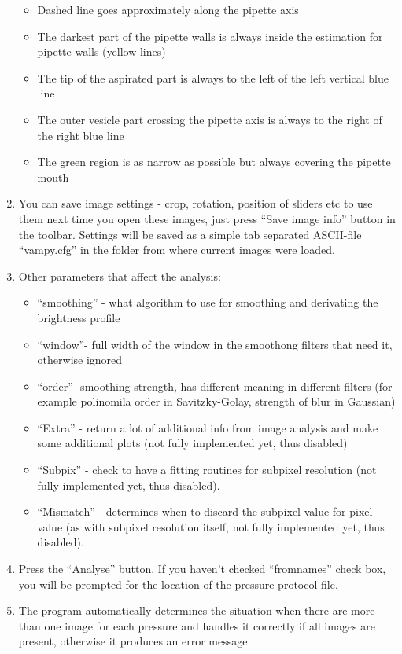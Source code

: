 \begin{enumerate}
\begin{itemize}
		\item Dashed line goes approximately along the pipette axis
		\item The darkest part of the pipette walls is always inside the estimation for pipette walls (yellow lines)
		\item The tip of the aspirated part is always to the left of the left vertical blue line
		\item The outer vesicle part crossing the pipette axis is always to the right of the right blue line
		\item The green region is as narrow as possible but always covering the pipette mouth
	\end{itemize} 
	\item You can save image settings - crop, rotation, position of sliders etc to use them next time you open these images, just press ``Save image info'' button in the toolbar. Settings will be saved as a simple tab separated ASCII-file ``vampy.cfg'' in the folder from where current images were loaded.
	\item Other parameters that affect the analysis:
	\begin{itemize}
		\item ``smoothing'' - what algorithm to use for smoothing and derivating the brightness profile
		\item ``window''- full width of the window in the smoothong filters that need it, otherwise ignored
		\item ``order''- smoothing strength, has different meaning in different filters (for example polinomila order in Savitzky-Golay, strength of blur in Gaussian)
		\item ``Extra'' - return a lot of additional info from image analysis and make some additional plots (not fully implemented yet, thus disabled)
		\item ``Subpix'' - check to have a fitting routines for subpixel resolution (not fully implemented yet, thus disabled).
		\item ``Mismatch'' - determines when to discard the subpixel value for pixel value (as with subpixel resolution itself, not fully implemented yet, thus disabled).
	\end{itemize}
	\item Press the ``Analyse'' button. If you haven't checked ``fromnames'' check box, you will be prompted for the location of the pressure protocol file.
	\item The program automatically determines the situation when there are more than one image for each pressure and handles it correctly if all images are present, otherwise it produces an error message.

\end{enumerate}
